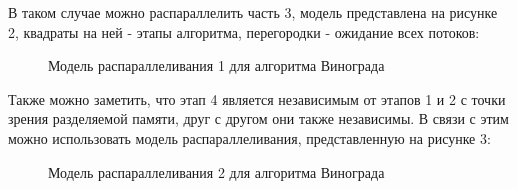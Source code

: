 \documentclass[a4paper, 14pt]{article}
\begin{document}
        В таком случае можно распараллелить часть 3, модель представлена на рисунке 2, квадраты на ней - этапы алгоритма, перегородки - ожидание всех потоков:\\ 
            	\begin{figure}[h]
        	\caption{Модель распараллеливания 1 для алгоритма Винограда}
        	\label{fig:schema_vinograd}
        \end{figure}
        
		Также можно заметить, что этап 4 является независимым от этапов 1 и 2 с точки зрения разделяемой памяти, друг с другом они также независимы. В связи с этим можно использовать модель распараллеливания, представленную на рисунке 3:\\
            
            	\begin{figure}[h]
        	\caption{Модель распараллеливания 2 для алгоритма Винограда}
        	\label{fig:schema_vinograd}
        \end{figure}		
		
\end{document}
